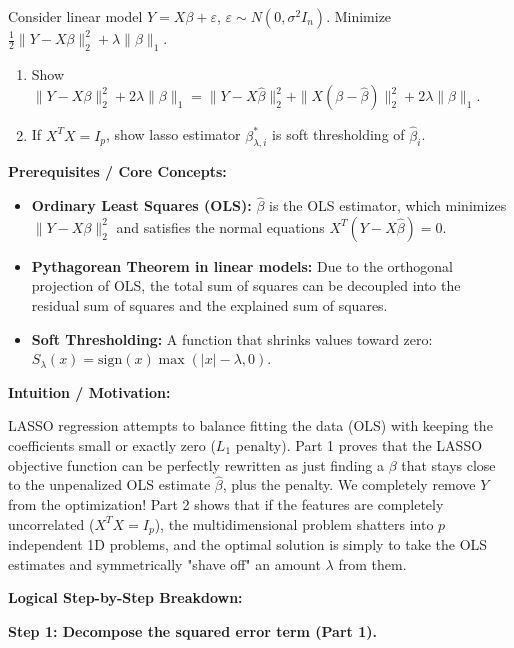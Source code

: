\begin{exercise}
\label{probability:2013:11}
Consider linear model $Y = X\beta + \varepsilon$, $\varepsilon \sim N(0, \sigma^2 I_n)$. Minimize $\frac{1}{2} \|Y - X\beta\|_2^2 + \lambda \|\beta\|_1$.
\begin{enumerate}
    \item Show $\|Y - X\beta\|_2^2 + 2\lambda \|\beta\|_1 = \|Y - X\hat{\beta}\|_2^2 + \|X(\beta - \hat{\beta})\|_2^2 + 2\lambda \|\beta\|_1$.
    \item If $X^T X = I_p$, show lasso estimator $\beta_{\lambda,i}^*$ is soft thresholding of $\hat{\beta}_i$.
\end{enumerate}
\end{exercise}

\begin{solution}
\textbf{Prerequisites / Core Concepts:}
\begin{itemize}
    \item \textbf{Ordinary Least Squares (OLS):} $\hat{\beta}$ is the OLS estimator, which minimizes $\|Y - X\beta\|_2^2$ and satisfies the normal equations $X^T(Y - X\hat{\beta}) = 0$.
    \item \textbf{Pythagorean Theorem in linear models:} Due to the orthogonal projection of OLS, the total sum of squares can be decoupled into the residual sum of squares and the explained sum of squares.
    \item \textbf{Soft Thresholding:} A function that shrinks values toward zero: $S_\lambda(x) = \text{sign}(x) \max(|x| - \lambda, 0)$.
\end{itemize}

\textbf{Intuition / Motivation:}

LASSO regression attempts to balance fitting the data (OLS) with keeping the coefficients small or exactly zero ($L_1$ penalty). Part 1 proves that the LASSO objective function can be perfectly rewritten as just finding a $\beta$ that stays close to the unpenalized OLS estimate $\hat{\beta}$, plus the penalty. We completely remove $Y$ from the optimization! Part 2 shows that if the features are completely uncorrelated ($X^T X = I_p$), the multidimensional problem shatters into $p$ independent 1D problems, and the optimal solution is simply to take the OLS estimates and symmetrically "shave off" an amount $\lambda$ from them.

\textbf{Logical Step-by-Step Breakdown:}

\textbf{Step 1: Decompose the squared error term (Part 1).}


\end{solution}
